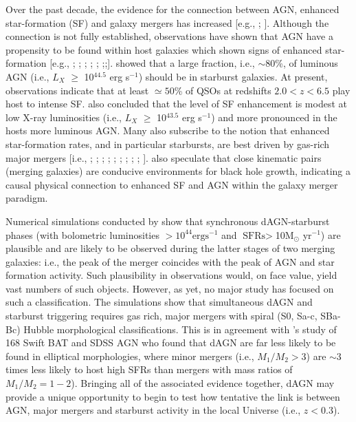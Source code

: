 Over the past decade, the evidence for the connection between AGN, enhanced star-formation (SF) and galaxy mergers has increased [e.g., \cite{Di_Matteo_2005}; \cite{2010ApJ...714L.118D}]. Although the connection is not fully established, observations have shown that AGN have a propensity to be found within host galaxies which shown signs of enhanced star-formation [e.g., \cite{2001ApJ...555..719C}; \cite{2004MNRAS.352..399J}; \cite{Sanchez_2004}; \cite{2006AJ....131...84V}; \cite{2006AJZakamska1496Z}; \cite{2011MNRASKaviraj};\cite{Stierwalt_2013};\cite{Carpineti_2015}]. \cite{tini_Bongiorno_Piconcelli_2013} showed that a large fraction, i.e., $\sim{80}$\%, of luminous AGN (i.e., $L_X$ $\ge$ 10$^{44.5}$ erg s$^{-1}$) should be in starburst galaxies. At present, observations indicate that at least $\simeq{50}$\% of QSOs at redshifts ${2.0}<{z}<{6.5}$ play host to intense SF. \cite{2012A&A...540A.109S} also concluded that the level of SF enhancement is modest at low X-ray luminosities (i.e., $L_X$ $\ge$ 10$^{43.5}$ erg s$^{-1}$) and more pronounced in the hosts more luminous AGN. Many also subscribe to the notion that enhanced star-formation rates, and in particular starbursts, are best driven by gas-rich major mergers [i.e., \cite{1984MNRAS.209..111J}; \cite{thews_Neugebauer_Scoville_1988}; \cite{Mihos_Hernquist_1996}; \cite{1997AA...326..537D}; \cite{Barton_Geller_Kenyon_2000}; \cite{Tissera_Dominguez-Tenreiro_Scannapieco_Saiz_2002}; \cite{2005A&A...438...87K}; \cite{Narayanan_Groppi_Kulesa_Walker_2005}; \cite{Narayanan_Hayward_Murray_2013}; \cite{Scott_Kaviraj_2013}]. \cite{2011ApJ...743....2S} also speculate that close kinematic pairs (merging galaxies) are conducive environments for black hole growth, indicating a causal physical connection to enhanced SF and AGN within the galaxy merger paradigm.

Numerical simulations conducted by \cite{Dotti_Bellovary_Callegari_2012} show that synchronous dAGN-starburst phases (with bolometric luminosities $>10^{44}\text{erg}\text{s}^{-1}$ and $\text{SFRs}>$10M$_{\odot}$ yr$^{-1}$) are plausible and are likely to be observed during the latter stages of two merging galaxies: i.e., the peak of the merger coincides with the peak of AGN and star formation activity. Such plausibility in observations would, on face value, yield vast numbers of such objects. However, as yet, no major study has focused on such a classification. The \cite{Dotti_Bellovary_Callegari_2012} simulations show that simultaneous dAGN and starburst triggering requires gas rich, major mergers with spiral (S0, Sa-c, SBa-Bc) Hubble morphological classifications. This is in agreement with \cite{Koss_2012}'s study of 168 Swift BAT and SDSS AGN who found that dAGN are far less likely to be found in elliptical morphologies, where minor mergers (i.e., $M_{1}/M_{2}>3$) are $\sim{3}$ times less likely to host high SFRs than mergers with mass ratios of $M_{1}/M_{2}={1-2}$). Bringing all of the associated evidence together, dAGN may provide a unique opportunity to begin to test how tentative the link is between AGN, major mergers and starburst activity in the local Universe (i.e., $z<{0.3}$).             

